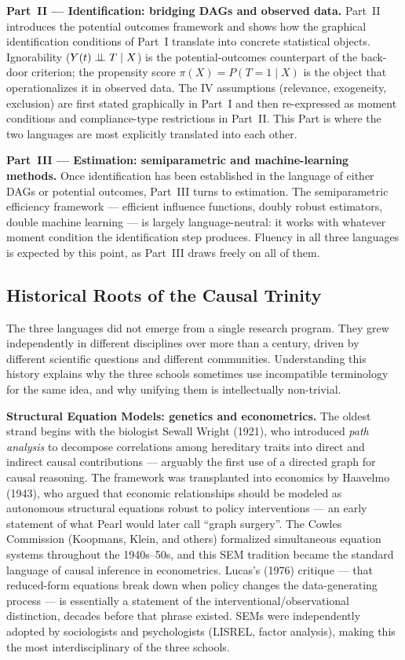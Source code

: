 \documentclass[master.tex]{subfiles}
\begin{document}
\medskip
\noindent\textbf{Part~II --- Identification: bridging DAGs and observed data.}
Part~II introduces the potential outcomes framework and shows how the
graphical identification conditions of Part~I translate into concrete
statistical objects.  Ignorability ($Y(t) \perp\!\!\!\perp T \mid X$) is the
potential-outcomes counterpart of the back-door criterion; the
propensity score $\pi(X) = P(T{=}1 \mid X)$ is the object that
operationalizes it in observed data.  The IV assumptions (relevance,
exogeneity, exclusion) are first stated graphically in Part~I and then
re-expressed as moment conditions and compliance-type restrictions in
Part~II.  This Part is where the two languages are most explicitly
translated into each other.

\medskip
\noindent\textbf{Part~III --- Estimation: semiparametric and machine-learning methods.}
Once identification has been established in the language of either DAGs
or potential outcomes, Part~III turns to estimation.  The semiparametric
efficiency framework --- efficient influence functions, doubly robust
estimators, double machine learning --- is largely language-neutral: it
works with whatever moment condition the identification step produces.
Fluency in all three languages is expected by this point, as
Part~III draws freely on all of them.

\subsection{Historical Roots of the Causal Trinity}
\label{w1:subsec:history}

The three languages did not emerge from a single research program.  They
grew independently in different disciplines over more than a century, driven
by different scientific questions and different communities.  Understanding
this history explains why the three schools sometimes use incompatible
terminology for the same idea, and why unifying them is intellectually
non-trivial.

\medskip
\noindent\textbf{\color{semcolor}Structural Equation Models: genetics and econometrics.}
The oldest strand begins with the biologist Sewall Wright (1921), who
introduced \emph{path analysis} to decompose correlations among hereditary
traits into direct and indirect causal contributions --- arguably the first
use of a directed graph for causal reasoning.  The framework was
transplanted into economics by Haavelmo (1943), who argued that economic
relationships should be modeled as autonomous structural equations robust
to policy interventions --- an early statement of what Pearl would later
call ``graph surgery''.  The Cowles Commission (Koopmans, Klein, and others)
formalized simultaneous equation systems throughout the 1940s--50s, and
this SEM tradition became the standard language of causal inference in
econometrics.  Lucas's (1976) critique --- that reduced-form equations break
down when policy changes the data-generating process --- is essentially a
statement of the interventional/observational distinction, decades before
that phrase existed.  SEMs were independently adopted by sociologists and
psychologists (LISREL, factor analysis), making this the most
interdisciplinary of the three schools.
\end{document}
